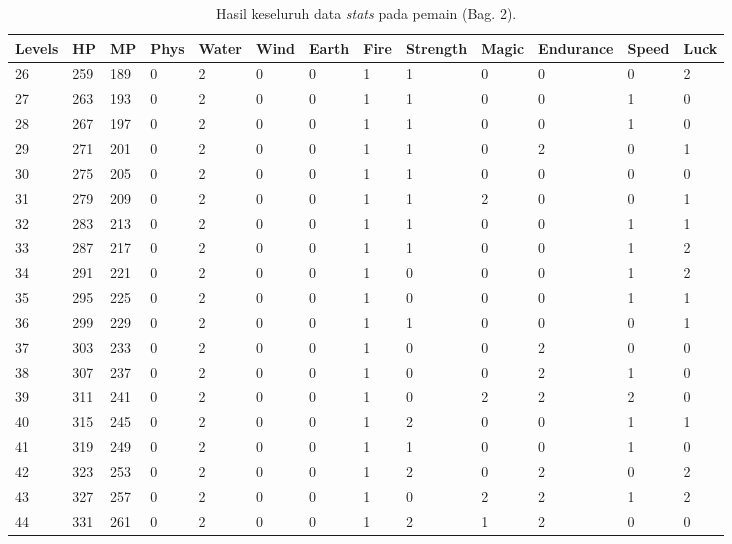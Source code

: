 \begin{sidewaystable}[!h]
	\centering
	\caption{Hasil keseluruh data \textit{stats} pada pemain (Bag. 2).}
	\label{tb:player_all_stats_2}
	\vspace{1ex}
		\begin{tabular}{|l|l|l|l|l|l|l|l|l|l|l|l|l|}
			\hline
			\rowcolor[HTML]{C0C0C0} 
			\textbf{Levels} & \textbf{HP} & \textbf{MP} & \textbf{Phys} & \textbf{Water} & \textbf{Wind} & \textbf{Earth} & \textbf{Fire} & \textbf{Strength} & \textbf{Magic} & \textbf{Endurance} & \textbf{Speed} & \textbf{Luck} \\ \hline
			26 & 259 & 189 & 0 & 2 & 0 & 0 & 1 & 1 & 0 & 0 & 0 & 2 \\ \hline
			27 & 263 & 193 & 0 & 2 & 0 & 0 & 1 & 1 & 0 & 0 & 1 & 0 \\ \hline
			28 & 267 & 197 & 0 & 2 & 0 & 0 & 1 & 1 & 0 & 0 & 1 & 0 \\ \hline
			29 & 271 & 201 & 0 & 2 & 0 & 0 & 1 & 1 & 0 & 2 & 0 & 1 \\ \hline
			30 & 275 & 205 & 0 & 2 & 0 & 0 & 1 & 1 & 0 & 0 & 0 & 0 \\ \hline
			31 & 279 & 209 & 0 & 2 & 0 & 0 & 1 & 1 & 2 & 0 & 0 & 1 \\ \hline
			32 & 283 & 213 & 0 & 2 & 0 & 0 & 1 & 1 & 0 & 0 & 1 & 1 \\ \hline
			33 & 287 & 217 & 0 & 2 & 0 & 0 & 1 & 1 & 0 & 0 & 1 & 2 \\ \hline
			34 & 291 & 221 & 0 & 2 & 0 & 0 & 1 & 0 & 0 & 0 & 1 & 2 \\ \hline
			35 & 295 & 225 & 0 & 2 & 0 & 0 & 1 & 0 & 0 & 0 & 1 & 1 \\ \hline
			36 & 299 & 229 & 0 & 2 & 0 & 0 & 1 & 1 & 0 & 0 & 0 & 1 \\ \hline
			37 & 303 & 233 & 0 & 2 & 0 & 0 & 1 & 0 & 0 & 2 & 0 & 0 \\ \hline
			38 & 307 & 237 & 0 & 2 & 0 & 0 & 1 & 0 & 0 & 2 & 1 & 0 \\ \hline
			39 & 311 & 241 & 0 & 2 & 0 & 0 & 1 & 0 & 2 & 2 & 2 & 0 \\ \hline
			40 & 315 & 245 & 0 & 2 & 0 & 0 & 1 & 2 & 0 & 0 & 1 & 1 \\ \hline
			41 & 319 & 249 & 0 & 2 & 0 & 0 & 1 & 1 & 0 & 0 & 1 & 0 \\ \hline
			42 & 323 & 253 & 0 & 2 & 0 & 0 & 1 & 2 & 0 & 2 & 0 & 2 \\ \hline
			43 & 327 & 257 & 0 & 2 & 0 & 0 & 1 & 0 & 2 & 2 & 1 & 2 \\ \hline
			44 & 331 & 261 & 0 & 2 & 0 & 0 & 1 & 2 & 1 & 2 & 0 & 0 \\ \hline

\end{tabular}
\end{sidewaystable}
